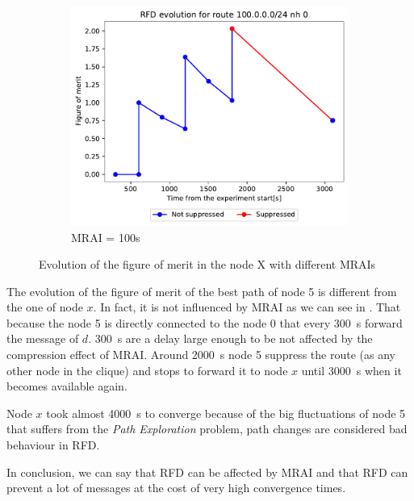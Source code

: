 \begin{figure}[h]
\begin{subfigure}[b]{0.3\textwidth}
     \end{subfigure}
     \hfill
     \begin{subfigure}[b]{0.3\textwidth}
         \centering
         \includegraphics[width=\textwidth]{images/RFD/clique/FigureOfMerit/mrai21_RFD_5_rfd_R1.pdf}
         \caption{MRAI = 100s}
         \label{fig:clique_5_mrai100}
     \end{subfigure}
        \caption{Evolution of the figure of merit in the node X with different MRAIs}
        \label{fig:clique_node5}
\end{figure}

The evolution of the figure of merit of the best path of node \num{5} is different
from the one of node $x$.
In fact, it is not influenced by \ac{MRAI} as we can see in .
That because the node \num{5} is directly connected to the node \num{0} that every
\SI{300}{\second} forward the message of $d$. \SI{300}{\second} are a delay large
enough to be not affected by the compression effect of \ac{MRAI}.
Around \SI{2000}{\second} node \num{5} suppress the route (as any other node in the
clique) and stops to forward it to node $x$ until \SI{3000}{\second} when it becomes
available again.

Node $x$ took almost \SI{4000}{\second} to converge because of the big fluctuations
of node \num{5} that suffers from the \textit{Path Exploration} problem, path
changes are considered bad behaviour in \ac{RFD}.

In conclusion, we can say that \ac{RFD} can be affected by \ac{MRAI} and
that \ac{RFD} can prevent a lot of messages at the cost of very high convergence
times.

